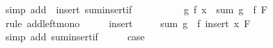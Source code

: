 \begin{isabellebody}
\ {\isacharparenleft}{\kern0pt}simp\ add{\isacharcolon}{\kern0pt}\ {}\ insert\ sum{\isachardot}{\kern0pt}insert{\isacharunderscore}{\kern0pt}if{\isacharparenright}{\kern0pt}\isanewline
\ \ \isamarkupfalse%
\ \isamarkupfalse%
\ {}\ \isamarkupfalse%
\ {\isachardoublequoteopen}{\isasymdots}\ {\isasymle}\ g\ {\isacharparenleft}{\kern0pt}f\ x{\isacharparenright}{\kern0pt}\ {\isacharplus}{\kern0pt}\ sum\ {\isacharparenleft}{\kern0pt}g\ {\isasymcirc}\ f{\isacharparenright}{\kern0pt}\ F{\isachardoublequoteclose}\ \isamarkupfalse%
\ {\isacharparenleft}{\kern0pt}rule\ add{\isacharunderscore}{\kern0pt}left{\isacharunderscore}{\kern0pt}mono{\isacharparenright}{\kern0pt}\isanewline
\ \ \isamarkupfalse%
\ \isamarkupfalse%
\ insert{\isacharparenleft}{\kern0pt}{}{\isacharcomma}{\kern0pt}\ {}{\isacharparenright}{\kern0pt}\ \isamarkupfalse%
\ {\isachardoublequoteopen}{\isasymdots}\ {\isacharequal}{\kern0pt}\ sum\ {\isacharparenleft}{\kern0pt}g\ {\isasymcirc}\ f{\isacharparenright}{\kern0pt}\ {\isacharparenleft}{\kern0pt}insert\ x\ F{\isacharparenright}{\kern0pt}{\isachardoublequoteclose}\ \isamarkupfalse%
\ {\isacharparenleft}{\kern0pt}simp\ add{\isacharcolon}{\kern0pt}\ sum{\isachardot}{\kern0pt}insert{\isacharunderscore}{\kern0pt}if{\isacharparenright}{\kern0pt}\isanewline
\ \ \isamarkupfalse%
\ \isamarkupfalse%
\ {\isacharquery}{\kern0pt}case\ \isacommand{{\isachardot}{\kern0pt}}\isamarkupfalse%
\isanewline
{}\isamarkupfalse%
%
\endisatagproof
{\isafoldproof}%
%
\isadelimproof
\isanewline
%
\endisadelimproof
%
\isadelimtheory
\isanewline
%
\endisadelimtheory
%
\isatagtheory
{}\isamarkupfalse%
%
\endisatagtheory
{\isafoldtheory}%
%
\isadelimtheory
%
\endisadelimtheory
%
\end{isabellebody}%
\endinput
